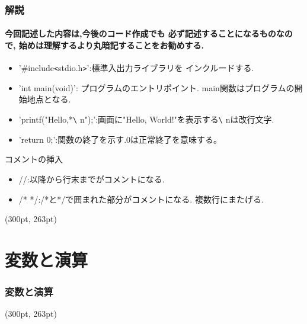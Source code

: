 \documentclass[dvipdfmx]{beamer}
\begin{document}
\begin{frame}[t, fragile]
    \frametitle{解説}
    \framesubtitle{今回記述した内容は,今後のコード作成でも
        必ず記述することになるものなので,
        始めは理解するより丸暗記することをお勧めする.}
    \begin{itemize}
        \item '\#include\verb|<|stdio.h\verb|>|':標準入出力ライブラリを
                インクルードする.
        \item 'int main(void)': プログラムのエントリポイント.
                main関数はプログラムの開始地点となる.
        \item 'printf("Hello,*\verb|\| n");':画面に"Hello, 
                World!"を表示する\verb|\| nは改行文字.
        \item 'return 0;':関数の終了を示す.0は正常終了を意味する。
    \end{itemize}
    \begin{itembox}[l]{コメントの挿入}
        \begin{itemize}
            \item //:以降から行末までがコメントになる.
            \item /* */:/*と*/で囲まれた部分がコメントになる.
                    複数行にまたげる.
        \end{itemize}
    \end{itembox}
    \begin{textblock*}{0.3\linewidth}(300pt, 263pt)
    \space
    \end{textblock*}
\end{frame}

\section{変数と演算}
\begin{frame}[t, fragile]
    \frametitle{変数と演算}
    \tableofcontents[sections={2,6}]
    \begin{textblock*}{0.3\linewidth}(300pt, 263pt)
    \space
    \end{textblock*}
\end{frame}
\end{document}
